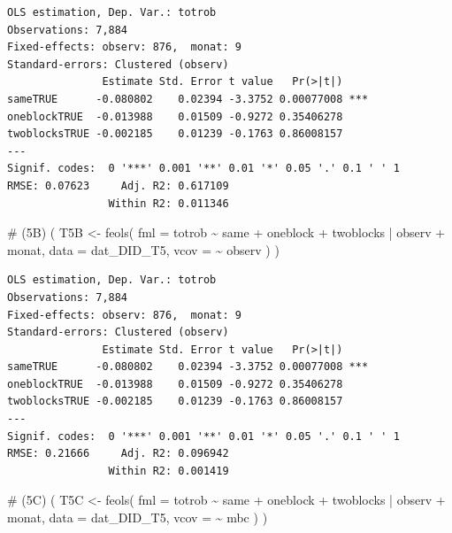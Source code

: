 \documentclass[
  a4paper,
  DIV=11,
  oneside]{scrreprt}
\newenvironment{Shaded}{\begin{snugshade}}{\end{snugshade}}
\newcommand{\AttributeTok}[1]{\textcolor[rgb]{0.40,0.45,0.13}{#1}}
\newcommand{\CommentTok}[1]{\textcolor[rgb]{0.37,0.37,0.37}{#1}}
\newcommand{\FunctionTok}[1]{\textcolor[rgb]{0.28,0.35,0.67}{#1}}
\newcommand{\NormalTok}[1]{\textcolor[rgb]{0.00,0.23,0.31}{#1}}
\newcommand{\OtherTok}[1]{\textcolor[rgb]{0.00,0.23,0.31}{#1}}
\newcommand{\SpecialCharTok}[1]{\textcolor[rgb]{0.37,0.37,0.37}{#1}}
\begin{document}
\begin{verbatim}
OLS estimation, Dep. Var.: totrob
Observations: 7,884
Fixed-effects: observ: 876,  monat: 9
Standard-errors: Clustered (observ) 
               Estimate Std. Error t value   Pr(>|t|)    
sameTRUE      -0.080802    0.02394 -3.3752 0.00077008 ***
oneblockTRUE  -0.013988    0.01509 -0.9272 0.35406278    
twoblocksTRUE -0.002185    0.01239 -0.1763 0.86008157    
---
Signif. codes:  0 '***' 0.001 '**' 0.01 '*' 0.05 '.' 0.1 ' ' 1
RMSE: 0.07623     Adj. R2: 0.617109
                Within R2: 0.011346
\end{verbatim}

\begin{Shaded}
\begin{Highlighting}[]
\CommentTok{\# (5B)}
\NormalTok{(}
\NormalTok{  T5B }\OtherTok{\textless{}{-}} \FunctionTok{feols}\NormalTok{(}
    \AttributeTok{fml =}\NormalTok{ totrob }\SpecialCharTok{\textasciitilde{}} 
\NormalTok{      same}
    \SpecialCharTok{+}\NormalTok{ oneblock}
    \SpecialCharTok{+}\NormalTok{ twoblocks}
    \SpecialCharTok{|}\NormalTok{ observ }\SpecialCharTok{+}\NormalTok{ monat,}
    \AttributeTok{data =}\NormalTok{ dat\_DID\_T5, }
    \AttributeTok{vcov =} \SpecialCharTok{\textasciitilde{}}\NormalTok{ observ}
\NormalTok{  )}
\NormalTok{)}
\end{Highlighting}
\end{Shaded}

\begin{verbatim}
OLS estimation, Dep. Var.: totrob
Observations: 7,884
Fixed-effects: observ: 876,  monat: 9
Standard-errors: Clustered (observ) 
               Estimate Std. Error t value   Pr(>|t|)    
sameTRUE      -0.080802    0.02394 -3.3752 0.00077008 ***
oneblockTRUE  -0.013988    0.01509 -0.9272 0.35406278    
twoblocksTRUE -0.002185    0.01239 -0.1763 0.86008157    
---
Signif. codes:  0 '***' 0.001 '**' 0.01 '*' 0.05 '.' 0.1 ' ' 1
RMSE: 0.21666     Adj. R2: 0.096942
                Within R2: 0.001419
\end{verbatim}

\begin{Shaded}
\begin{Highlighting}[]
\CommentTok{\# (5C)}
\NormalTok{(}
\NormalTok{  T5C }\OtherTok{\textless{}{-}} \FunctionTok{feols}\NormalTok{(}
    \AttributeTok{fml =}\NormalTok{ totrob }\SpecialCharTok{\textasciitilde{}} 
\NormalTok{      same}
    \SpecialCharTok{+}\NormalTok{ oneblock}
    \SpecialCharTok{+}\NormalTok{ twoblocks}
    \SpecialCharTok{|}\NormalTok{ observ }\SpecialCharTok{+}\NormalTok{ monat,}
    \AttributeTok{data =}\NormalTok{ dat\_DID\_T5, }
    \AttributeTok{vcov =} \SpecialCharTok{\textasciitilde{}}\NormalTok{ mbc}
\NormalTok{  )}
\NormalTok{)}
\end{Highlighting}
\end{Shaded}
\end{document}
